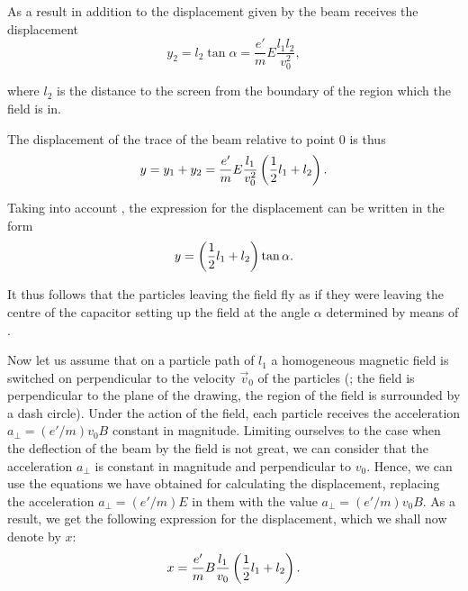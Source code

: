 \noindent
As a result in addition to the displacement given by  the beam receives the displacement
\begin{equation*}
    y_2 = l_2 \tan\alpha = \frac{e'}{m} E \frac{l_1 l_2}{v_0^2},
\end{equation*}

\noindent
where $l_2$ is the distance to the screen from the boundary of the region which the field is in.

The displacement of the trace of the beam relative to point $0$ is thus
\begin{equation}\label{eq:10_7}
    y = y_1 + y_2 = \frac{e'}{m} E \frac{l_1}{v_0^2} \left(\frac{1}{2} l_1 + l_2\right).
\end{equation}

\noindent
Taking into account , the expression for the displacement can be written in the form
\begin{equation*}
    y = \left(\frac{1}{2} l_1 + l_2\right) \tan\alpha.
\end{equation*}

\noindent
It thus follows that the particles leaving the field fly as if they were leaving the centre of the capacitor setting up the field at the angle $\alpha$ determined by means of .

Now let us assume that on a particle path of $l_1$ a homogeneous magnetic field is switched on perpendicular to the velocity $\vec{v}_0$ of the particles (; the field is perpendicular to the plane of the drawing, the region of the field is surrounded by a dash circle).
Under the action of the field, each particle receives the acceleration $a_{\perp}=(e'/m)v_0B$ constant in magnitude.
Limiting ourselves to the case when the deflection of the beam by the field is not great, we can consider that the acceleration $a_{\perp}$ is constant in magnitude and perpendicular to $v_0$.
Hence, we can use the equations we have obtained for calculating the displacement, replacing the acceleration $a_{\perp}=(e'/m)E$ in them with the value $a_{\perp}=(e'/m)v_0B$.
As a result, we get the following expression for the displacement, which we shall now denote by $x$:
\begin{equation}\label{eq:10_8}
    x = \frac{e'}{m} B \frac{l_1}{v_0} \left(\frac{1}{2} l_1 + l_2\right).
\end{equation}


